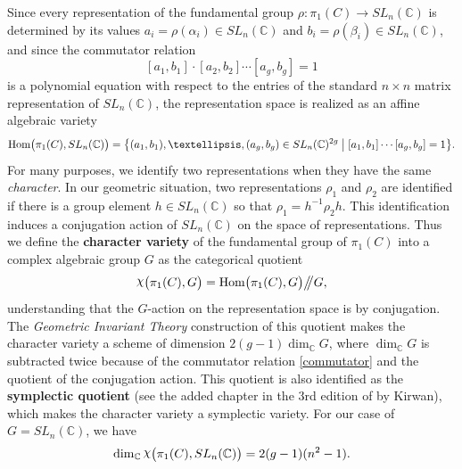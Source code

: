 \documentclass{amsart}
\theoremstyle{definition}
\numberwithin{equation}{section}
\numberwithin{figure}{section}
\def\Hom{{\text{\rm{Hom}}}}
\def\rchi{{\hbox{\raise1.5pt\hbox{$\chi$}}}}
\def\a{\alpha}
\def\b{\beta}
\newcommand{\be}{\begin{equation}}
\newcommand{\ee}{\end{equation}}
\newcommand{\bC}{{\mathbb{C}}}
\newcommand{\lrar}{\longrightarrow}
\begin{document}
Since every representation of the fundamental group
 $\rho:\pi_1(C)\lrar SL_n(\bC)$
is determined by its values $a_i=\rho(\a_i)\in SL_n(\bC)$ and 
$b_i=\rho(\b_i)\in SL_n(\bC)$, and since
the commutator relation 
\be
\label{commutator}
[a_1,b_1]\cdot [a_2,b_2] \cdots [a_g,b_g]=1
\ee
is a polynomial 
equation with respect to the entries of the standard $n\times n$
matrix representation of $SL_n(\bC)$,
the representation space is realized as an affine algebraic variety
$$
\Hom\big(\pi_1(C), SL_n(\bC)\big) =
\big\{(a_1,b_1),\dots,(a_g,b_g)\in SL_n(\bC)^{2g}\;\big|\;
[a_1,b_1] \cdots [a_g,b_g]=1\big\}.
$$
For many purposes, we identify two representations when they 
have the same \emph{character}. In our geometric situation, 
two representations $\rho_1$ and $\rho_2$ are identified
if there is a group element $h\in SL_n(\bC)$ so that 
$\rho_1 = h^{-1}\rho_2 h$. This identification induces a
conjugation action of $SL_n(\bC)$ on the space of representations.
Thus we define the \textbf{character variety} 
of the fundamental group of $\pi_1(C)$ into a complex  algebraic 
group $G$ as the categorical 
quotient
\be
\label{charvar}
\rchi \big(\pi_1(C), G\big) = \Hom\big(\pi_1(C), G\big)
\big/\!\!\big/ G,
\ee
understanding that the $G$-action on the representation space is
by conjugation. The \emph{Geometric Invariant Theory} construction
\cite{MFK}
of this quotient makes the character variety a scheme
of dimension  $2(g-1)\dim_\bC G$, where $\dim_\bC G$ is subtracted
twice because of the commutator relation \eqref{commutator} and
the quotient of the conjugation action. 
This quotient is also identified as the \textbf{symplectic quotient}
(see the added chapter in the 3rd edition of \cite{MFK} by Kirwan), 
which makes the character variety a symplectic variety. 
For our case of $G=SL_n(\bC)$, we have
$$
\dim_\bC \rchi \big(\pi_1(C), SL_n(\bC)\big) = 2(g-1)(n^2-1).
$$
\end{document}
